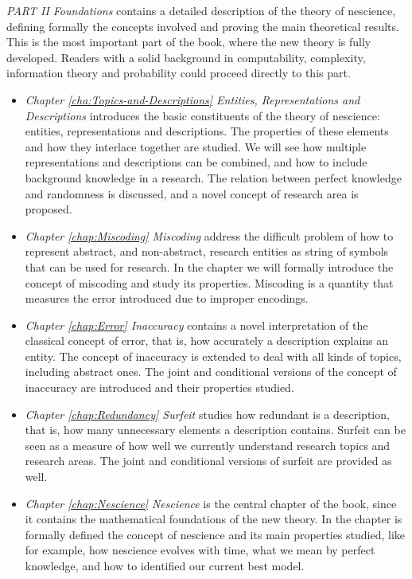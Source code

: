 \bigskip

\emph{PART II Foundations} contains a detailed description of the theory of nescience, defining formally the concepts involved and proving the main theoretical results. This is the most important part of the book, where the new theory is fully developed. Readers with a solid background in computability, complexity, information theory and probability could proceed directly to this part.

\begin{itemize}

\item \emph{Chapter \ref{cha:Topics-and-Descriptions} Entities, Representations and Descriptions} introduces the basic constituents of the theory of nescience: entities, representations and descriptions. The properties of these elements and how they interlace together are studied. We will see how multiple representations and descriptions can be combined, and how to include background knowledge in a research. The relation between perfect knowledge and randomness is discussed, and a novel concept of research area is proposed.

\item \emph{Chapter \ref{chap:Miscoding} Miscoding} address the difficult problem of how to represent abstract, and non-abstract, research entities as string of symbols that can be used for research. In the chapter we will formally introduce the concept of miscoding and study its properties. Miscoding is a quantity that measures the error introduced due to improper encodings.

\item \emph{Chapter \ref{chap:Error} Inaccuracy} contains a novel interpretation of the classical concept of error, that is, how accurately a description explains an entity. The concept of inaccuracy is extended to deal with all kinds of topics, including abstract ones. The joint and conditional versions of the concept of inaccuracy are introduced and their properties studied.

\item \emph{Chapter \ref{chap:Redundancy} Surfeit} studies how redundant is a description, that is, how many unnecessary elements a description contains. Surfeit can be seen as a measure of how well we currently understand research topics and research areas. The joint and conditional versions of surfeit are provided as well.

\item \emph{Chapter \ref{chap:Nescience} Nescience} is the central chapter of the book, since it contains the mathematical foundations of the new theory. In the chapter is formally defined the concept of nescience and its main properties studied, like for example, how nescience evolves with time, what we mean by perfect knowledge, and how to identified our current best model.


\end{itemize}
